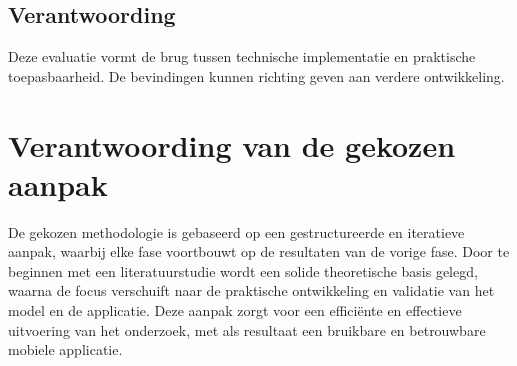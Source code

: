 \subsection{Verantwoording}
Deze evaluatie vormt de brug tussen technische implementatie en praktische toepasbaarheid. 
De bevindingen kunnen richting geven aan verdere ontwikkeling.

\section{Verantwoording van de gekozen aanpak}
De gekozen methodologie is gebaseerd op een gestructureerde en iteratieve aanpak, waarbij elke fase voortbouwt op de resultaten van de vorige fase. Door te beginnen met een literatuurstudie wordt een solide theoretische basis gelegd, waarna de focus verschuift naar de praktische ontwikkeling en validatie van het model en de applicatie. Deze aanpak zorgt voor een efficiënte en effectieve uitvoering van het onderzoek, met als resultaat een bruikbare en betrouwbare mobiele applicatie.

